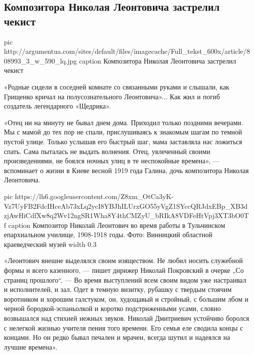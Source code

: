  
 
 
 
 
 
\subsection{Композитора Николая Леонтовича застрелил чекист}
\label{sec:16_12_2017.news.ua.argumentua.1.leontovych_mykola_chekist_smert}

\ifcmt
pic http://argumentua.com/sites/default/files/imagecache/Full_tekst_600x/article/808993_3_w_590_lq.jpg
caption Композитора Николая Леонтовича застрелил чекист
\fi

«Родные сидели в соседней комнате со связанными руками и слышали, как Грищенко
кричал на полусознательного Леонтовича»... Как жил и погиб создатель
легендарного «Щедрика».

«Отец ни на минуту не бывал днем дома. Приходил только поздними вечерами. Мы с
мамой до тех пор не спали, прислушиваясь к знакомым шагам по темной пустой
улице. Только услышав его быстрый шаг, мама заставляла нас ложиться спать. Сама
пыталась не выдать волнения. Отец, увлеченный своими произведениями, не боялся
ночных улиц в те неспокойные времена», — вспоминает о жизни в Киеве весной
1919 года Галина, дочь композитора Николая Леонтовича.

\ifcmt
pic https://lh6.googleusercontent.com/Z8xm_OtCa3yK-Vz7UyFB2FdcIHceAb73xLq2ycI8YBJhILUrxGO55yVgZ1SYccQRJdxEBp_XB3dzjAwHiCdfXw8q2Wv12ngSR1Wha8Y4thCMZyU_bRIkA8VDFeHtVpj3XT3bO0Tf
caption Композитор Николай Леонтович во время работы в Тульчинском епархиальном училище, 1908-1918 годы. Фото: Винницкий областной краеведческий музей
width 0.3
\fi

«Леонтович внешне выделялся своим изяществом. Не любил носить служебной формы и
всего казенного, — пишет дирижер Николай Покровский в очерке „Со страниц
прошлого“. — Во время выступлений всем своим видом уже настраивал и
исполнителей, и зал. Одет в темную визитку, рубашку с твердым стоячим
воротником и хорошим галстуком, он, худощавый и стройный, с большим лбом и
черной бородкой-эспаньолкой и коротко подстриженными усами, словно возвышался
над стихией нежных звуков. Николай Дмитриевич устойчиво боролся с нелегкой
жизнью учителя пения того времени. Его семья еле сводила концы с концами. Но он
редко бывал печален и мрачен, всегда шутил и надеялся на лучшие времена».

